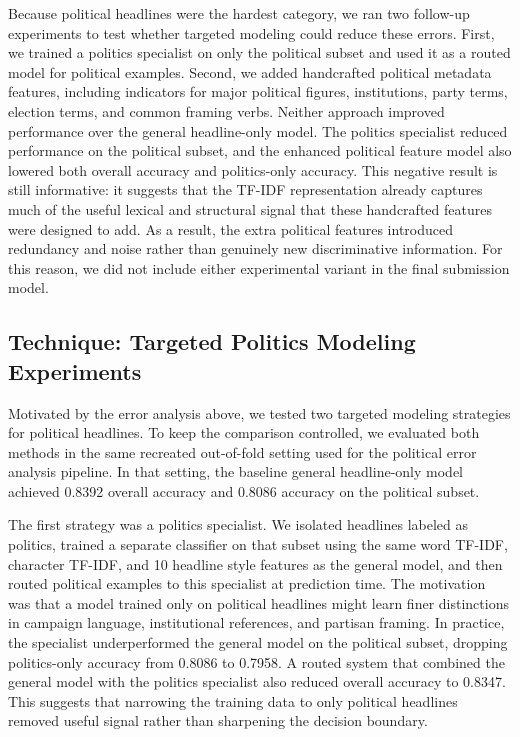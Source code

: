 \documentclass[10pt]{article}
\begin{document}
Because political headlines were the hardest category, we ran two follow-up experiments to test whether targeted modeling could reduce these errors. First, we trained a politics specialist on only the political subset and used it as a routed model for political examples. Second, we added handcrafted political metadata features, including indicators for major political figures, institutions, party terms, election terms, and common framing verbs. Neither approach improved performance over the general headline-only model. The politics specialist reduced performance on the political subset, and the enhanced political feature model also lowered both overall accuracy and politics-only accuracy. This negative result is still informative: it suggests that the TF-IDF representation already captures much of the useful lexical and structural signal that these handcrafted features were designed to add. As a result, the extra political features introduced redundancy and noise rather than genuinely new discriminative information. For this reason, we did not include either experimental variant in the final submission model.

\subsection{Technique: Targeted Politics Modeling Experiments}
Motivated by the error analysis above, we tested two targeted modeling strategies for political headlines. To keep the comparison controlled, we evaluated both methods in the same recreated out-of-fold setting used for the political error analysis pipeline. In that setting, the baseline general headline-only model achieved 0.8392 overall accuracy and 0.8086 accuracy on the political subset.

The first strategy was a politics specialist. We isolated headlines labeled as politics, trained a separate classifier on that subset using the same word TF-IDF, character TF-IDF, and 10 headline style features as the general model, and then routed political examples to this specialist at prediction time. The motivation was that a model trained only on political headlines might learn finer distinctions in campaign language, institutional references, and partisan framing. In practice, the specialist underperformed the general model on the political subset, dropping politics-only accuracy from 0.8086 to 0.7958. A routed system that combined the general model with the politics specialist also reduced overall accuracy to 0.8347. This suggests that narrowing the training data to only political headlines removed useful signal rather than sharpening the decision boundary.
\end{document}
